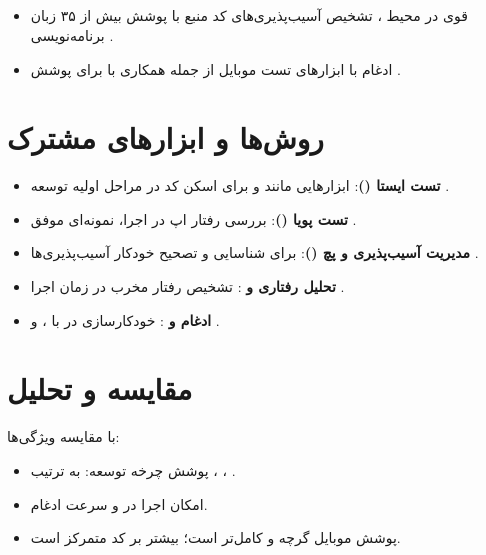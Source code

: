 \subsection{}
\begin{itemize}
  \renewcommand{\labelitemi}{\lr{$\bullet$}}
  \item {} قوی در محیط ، تشخیص آسیب‌پذیری‌های کد منبع با پوشش بیش از ۳۵ زبان برنامه‌نویسی \cite{checkmarx2024sast}.
  \item ادغام با ابزارهای تست موبایل از جمله همکاری با  برای پوشش  \cite{checkmarx2024mobile}.
\end{itemize}

\section{روش‌ها و ابزارهای مشترک}
\begin{itemize}
  \renewcommand{\labelitemi}{\lr{$\bullet$}}
  \item \textbf{تست ایستا ()}: ابزارهایی مانند  و  برای اسکن کد در مراحل اولیه توسعه \cite{nowsecure2024sast}.
  \item \textbf{تست پویا ()}: بررسی رفتار اپ در اجرا،  نمونه‌ای موفق \cite{nowsecure2024dast}.
  \item \textbf{مدیریت آسیب‌پذیری و پچ ()}:  برای شناسایی و تصحیح خودکار آسیب‌پذیری‌ها \cite{qualys2024vuln}.
  \item \textbf{تحلیل رفتاری و }: تشخیص رفتار مخرب در زمان اجرا  \cite{nowsecure2024mtd}.
  \item \textbf{ادغام  و }: خودکارسازی در  با ،  و  \cite{checkmarx2024cicd}.
\end{itemize}

\section{مقایسه و تحلیل}
با مقایسه ویژگی‌ها:
\begin{itemize}
  \renewcommand{\labelitemi}{\lr{$\bullet$}}
  \item پوشش چرخه توسعه: به ترتیب ، ، .
  \item امکان اجرا در  و سرعت ادغام.
  \item پوشش موبایل گرچه  و  کامل‌تر است؛  بیشتر بر کد متمرکز است.
\end{itemize}


